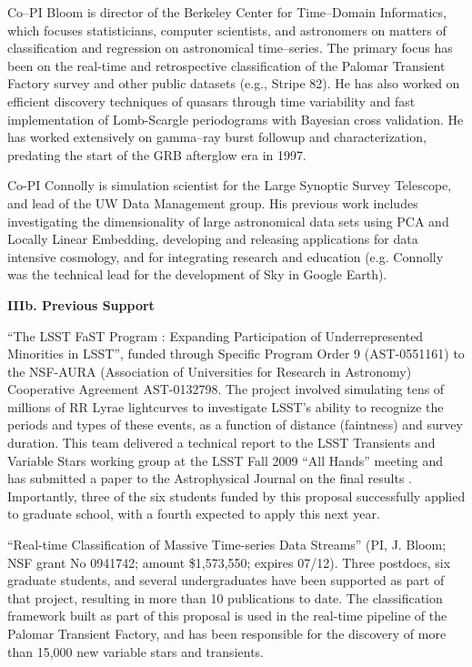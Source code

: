  \smallskip

Co--PI Bloom is director of the Berkeley Center for Time--Domain Informatics,
which focuses statisticians, computer scientists, and astronomers on matters of
classification and regression on astronomical time--series.  The primary focus
has been on the real-time and retrospective classification of the Palomar
Transient Factory survey and other public datasets (e.g., Stripe 82). He has
also worked on efficient discovery techniques of quasars through time
variability and fast implementation of Lomb-Scargle periodograms with Bayesian
cross validation. He has worked extensively on gamma--ray burst followup and
characterization, predating the start of the GRB afterglow era in 1997.

 \smallskip

Co-PI Connolly is simulation scientist for the Large Synoptic Survey Telescope,
and lead of the UW Data Management group.  His previous work includes
investigating the dimensionality of large astronomical data sets using PCA and
Locally Linear Embedding, developing and releasing applications for data
intensive cosmology, and for integrating research and education (e.g. Connolly
was the technical lead for the development of Sky in Google Earth).

\bigskip \centerline{\bf IIIb. Previous Support} \smallskip

 \smallskip

``The LSST FaST Program : Expanding Participation of Underrepresented Minorities
in LSST'', funded through Specific Program Order 9 (AST-0551161) to the NSF-AURA
(Association of Universities for Research in Astronomy) Cooperative Agreement
AST-0132798.  The project involved simulating tens of millions of RR Lyrae
lightcurves to investigate LSST's ability to recognize the periods and types of
these events, as a function of distance (faintness) and survey duration.  This
team delivered a technical report to the LSST Transients and Variable Stars
working group at the LSST Fall 2009 ``All Hands'' meeting and has submitted a
paper to the Astrophysical Journal on the final results \citep{RRLyrae}.
Importantly, three of the six students funded by this proposal successfully
applied to graduate school, with a fourth expected to apply this next year.

 \smallskip

``Real-time Classification of Massive Time-series Data Streams'' (PI, J. Bloom;
NSF grant No 0941742; amount \$1,573,550; expires 07/12).  Three postdocs, six
graduate students, and several undergraduates have been supported as part of
that project, resulting in more than 10 publications to date.  The
classification framework built as part of this proposal is used in the real-time
pipeline of the Palomar Transient Factory, and has been responsible for the
discovery of more than 15,000 new variable stars and transients.


